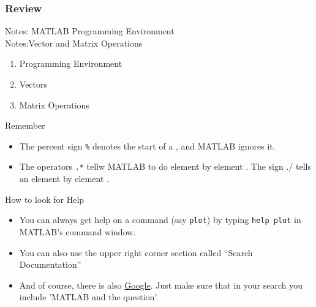 \documentclass[11pt]{beamer}
\begin{document}
\begin{frame}[fragile]
	\frametitle{Review}
	
	\begin{block}{}
		\centering
		Notes: MATLAB Programming Environment \\
		Notes:Vector and Matrix Operations
	\end{block}
	\begin{minipage}[t]{0.43\linewidth}
		\vspace{-10pt}
		\begin{enumerate}
			\item Programming Environment
			\item Vectors 
			\item Matrix Operations
		\end{enumerate}
		\vspace{-10pt}
		\begin{alertblock}{Remember}
			\begin{itemize}
				\item The percent sign \verb|%| denotes
				the start of a , and MATLAB ignores it.\\
				\item The operators \verb|.*| tellw MATLAB to do element by element . The sign ./ tells an element by element . 
			\end{itemize}
		\end{alertblock}
	\end{minipage}
	\hspace{10pt}
	\begin{minipage}[t]{0.51\linewidth}
		\vspace{-15pt}
		\begin{block}{How to look for Help}
			\begin{itemize}
				\item You can always get help on a command (say \verb|plot|) by typing \verb|help plot| in MATLAB's command window.
				\item You can also use the upper right corner section called ``Search Documentation''
				\item And of course, there is also \href{www.google.com}{Google}. Just make sure that in your search you include 'MATLAB and the question'
			\end{itemize}			
		\end{block}
	\end{minipage}
	
\end{frame}
\end{document}
